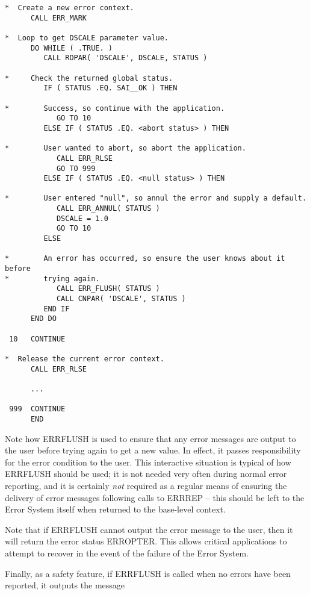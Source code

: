 \documentclass[twoside,11pt]{article}
\renewcommand{\_}{\texttt{\symbol{95}}}
\begin{document}
\begin {small}
\begin{verbatim}
*  Create a new error context.
      CALL ERR_MARK

*  Loop to get DSCALE parameter value.
      DO WHILE ( .TRUE. )
         CALL RDPAR( 'DSCALE', DSCALE, STATUS )

*     Check the returned global status.
         IF ( STATUS .EQ. SAI__OK ) THEN

*        Success, so continue with the application.
            GO TO 10
         ELSE IF ( STATUS .EQ. <abort status> ) THEN

*        User wanted to abort, so abort the application.
            CALL ERR_RLSE
            GO TO 999
         ELSE IF ( STATUS .EQ. <null status> ) THEN

*        User entered "null", so annul the error and supply a default.
            CALL ERR_ANNUL( STATUS )
            DSCALE = 1.0
            GO TO 10
         ELSE

*        An error has occurred, so ensure the user knows about it before
*        trying again.
            CALL ERR_FLUSH( STATUS )
            CALL CNPAR( 'DSCALE', STATUS )
         END IF
      END DO

 10   CONTINUE

*  Release the current error context.
      CALL ERR_RLSE

      ...

 999  CONTINUE
      END
\end{verbatim}
\end {small}

Note how ERR\_FLUSH is used to ensure that any error messages are output to
the user before trying again to get a new value.
In effect, it passes responsibility for the error condition to the user.
This interactive situation is typical of how ERR\_FLUSH should
be used; it is not needed very often during normal error reporting, and it
is certainly \emph{not} required as a regular means of ensuring the delivery
of error messages following calls to ERR\_REP --
this should be left to the Error System itself when returned to the base-level
context.

Note that if ERR\_FLUSH cannot output the error message to the user, then it
will return the error status ERR\_\_OPTER.
This allows critical applications to attempt to recover in the event of the
failure of the Error System.

Finally, as a safety feature, if ERR\_FLUSH is called when no errors have
been reported, it outputs the message
\end{document}
